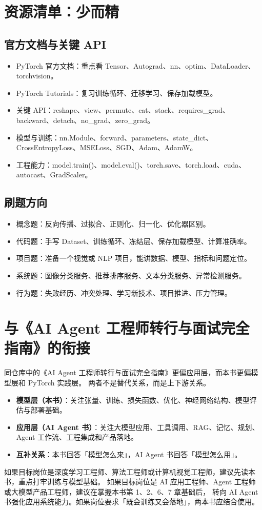 \section{资源清单：少而精}
\subsection{官方文档与关键 API}
\begin{itemize}[leftmargin=2em]
  \item PyTorch 官方文档：重点看 Tensor、Autograd、nn、optim、DataLoader、torchvision。
  \item PyTorch Tutorials：复习训练循环、迁移学习、保存加载模型。
  \item 关键 API：reshape、view、permute、cat、stack、requires\_grad、backward、detach、no\_grad、zero\_grad。
  \item 模型与训练：nn.Module、forward、parameters、state\_dict、CrossEntropyLoss、MSELoss、SGD、Adam、AdamW。
  \item 工程能力：model.train()、model.eval()、torch.save、torch.load、cuda、autocast、GradScaler。
\end{itemize}
\subsection{刷题方向}
\begin{itemize}[leftmargin=2em]
  \item 概念题：反向传播、过拟合、正则化、归一化、优化器区别。
  \item 代码题：手写 Dataset、训练循环、冻结层、保存加载模型、计算准确率。
  \item 项目题：准备一个视觉或 NLP 项目，能讲数据、模型、指标和问题定位。
  \item 系统题：图像分类服务、推荐排序服务、文本分类服务、异常检测服务。
  \item 行为题：失败经历、冲突处理、学习新技术、项目推进、压力管理。
\end{itemize}
\section{与《AI Agent 工程师转行与面试完全指南》的衔接}
同仓库中的《AI Agent 工程师转行与面试完全指南》更偏应用层，而本书更偏模型层和 PyTorch 实践层。
两者不是替代关系，而是上下游关系。
\begin{itemize}[leftmargin=2em]
  \item \textbf{模型层（本书）}：关注张量、训练、损失函数、优化、神经网络结构、模型评估与部署基础。
  \item \textbf{应用层（AI Agent 书）}：关注大模型应用、工具调用、RAG、记忆、规划、Agent 工作流、工程集成和产品落地。
  \item \textbf{互补关系}：本书回答「模型怎么来」，AI Agent 书回答「模型怎么用」。
\end{itemize}
如果目标岗位是深度学习工程师、算法工程师或计算机视觉工程师，建议先读本书，重点打牢训练与模型基础。
如果目标岗位是 AI 应用工程师、Agent 工程师或大模型产品工程师，建议在掌握本书第 1、2、6、7 章基础后，
转向 AI Agent 书强化应用系统能力。如果岗位要求「既会训练又会落地」，两本书应结合使用。
